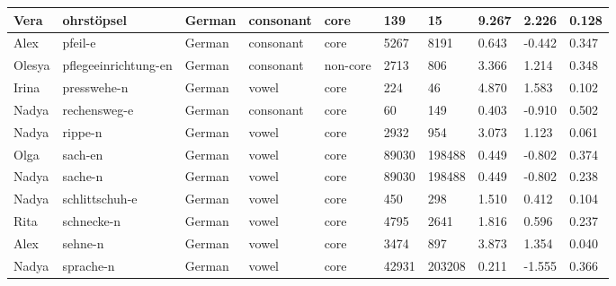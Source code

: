 \begin{longtable}{|p{1.2cm}|p{3cm}|p{1cm}|p{1.5cm}|p{1.5cm}|R{1.2cm}|R{1cm}|R{1cm}|R{0.8cm}|R{0.8cm}|}
Vera      & ohrst\"{o}psel         & German        & consonant        & core      & 139          & 15             & 9.267                 & 2.226             & 0.128        \\ \hline
Alex      & pfeil-e                & German        & consonant        & core      & 5267         & 8191           & 0.643                 & -0.442            & 0.347        \\ \hline
Olesya    & pflegeeinrichtung-en   & German        & consonant        & non-core  & 2713         & 806            & 3.366                 & 1.214             & 0.348        \\ \hline
Irina     & presswehe-n            & German        & vowel            & core      & 224          & 46             & 4.870                 & 1.583             & 0.102        \\ \hline
Nadya     & rechensweg-e           & German        & consonant        & core      & 60           & 149            & 0.403                 & -0.910            & 0.502        \\ \hline
Nadya     & rippe-n                & German        & vowel            & core      & 2932         & 954            & 3.073                 & 1.123             & 0.061        \\ \hline
Olga      & sach-en                & German        & vowel            & core      & 89030        & 198488         & 0.449                 & -0.802            & 0.374        \\ \hline
Nadya     & sache-n                & German        & vowel            & core      & 89030        & 198488         & 0.449                 & -0.802            & 0.238        \\ \hline
Nadya     & schlittschuh-e         & German        & vowel            & core      & 450          & 298            & 1.510                 & 0.412             & 0.104        \\ \hline
Rita      & schnecke-n             & German        & vowel            & core      & 4795         & 2641           & 1.816                 & 0.596             & 0.237        \\ \hline
Alex      & sehne-n                & German        & vowel            & core      & 3474         & 897            & 3.873                 & 1.354             & 0.040        \\ \hline
Nadya     & sprache-n              & German        & vowel            & core      & 42931        & 203208         & 0.211                 & -1.555            & 0.366        \\ \hline

\end{longtable}
